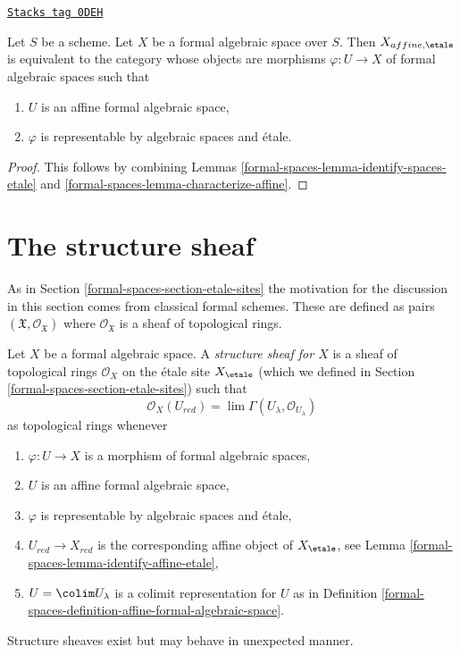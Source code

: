 \begin{lemma}
\label{formal-spaces-lemma-identify-affine-etale}
\href{https://stacks.math.columbia.edu/tag/0DEH}{\texttt{Stacks tag 0DEH}}

Let $S$ be a scheme. Let $X$ be a formal algebraic space over $S$.
Then $X_{affine, \etale}$ is equivalent to the category whose objects
are morphisms $\varphi : U \to X$ of formal algebraic spaces such that
\begin{enumerate}
\item $U$ is an affine formal algebraic space,
\item $\varphi$ is representable by algebraic spaces and \'etale.
\end{enumerate}
\end{lemma}

\begin{proof}
This follows by combining Lemmas \ref{formal-spaces-lemma-identify-spaces-etale} and
\ref{formal-spaces-lemma-characterize-affine}.
\end{proof}

\section{The structure sheaf}
\label{formal-spaces-section-structure-sheaf}
As in Section \ref{formal-spaces-section-etale-sites} the motivation for the discussion
in this section comes from classical formal schemes. These are defined as pairs
$(\mathfrak X, \mathcal{O}_\mathfrak X)$ where $\mathcal{O}_\mathfrak X$
is a sheaf of topological rings.

\medskip\noindent
Let $X$ be a formal algebraic space. A {\it structure sheaf for $X$}
is a sheaf of topological rings $\mathcal{O}_X$ on the \'etale site
$X_\etale$ (which we defined in Section \ref{formal-spaces-section-etale-sites}) such that
$$
\mathcal{O}_X(U_{red}) = \lim \Gamma(U_\lambda, \mathcal{O}_{U_\lambda})
$$
as topological rings whenever
\begin{enumerate}
\item $\varphi : U \to X$ is a morphism of formal algebraic spaces,
\item $U$ is an affine formal algebraic space,
\item $\varphi$ is representable by algebraic spaces and \'etale,
\item $U_{red} \to X_{red}$ is the corresponding affine object of
$X_\etale$, see
Lemma \ref{formal-spaces-lemma-identify-affine-etale},
\item $U = \colim U_\lambda$ is a colimit representation for $U$ as in
Definition \ref{formal-spaces-definition-affine-formal-algebraic-space}.
\end{enumerate}
Structure sheaves exist but may behave in unexpected manner.

